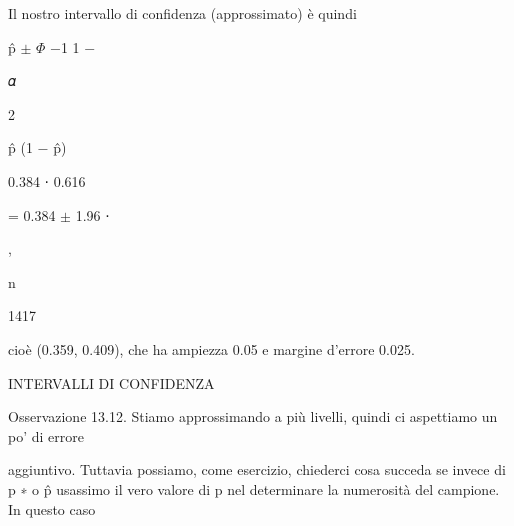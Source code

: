 \documentclass[a4paper,portrait,12pt]{article}
\begin{document}
\begin{flushleft}
Il nostro intervallo di confidenza (approssimato) \`{e} quindi
\end{flushleft}


\begin{flushleft}
p̂ $\pm$ $\Phi$ $-$1 1 $-$
\end{flushleft}





\begin{flushleft}
𝛼
\end{flushleft}


2





\begin{flushleft}
p̂ (1 $-$ p̂)
\end{flushleft}


0.384 ⋅ 0.616


= 0.384 $\pm$ 1.96 ⋅


,


\begin{flushleft}
n
\end{flushleft}


1417





\begin{flushleft}
cio\`{e} (0.359, 0.409), che ha ampiezza 0.05 e margine d'errore 0.025.
\end{flushleft}










\begin{flushleft}
INTERVALLI DI CONFIDENZA
\end{flushleft}





\begin{flushleft}
Osservazione 13.12. Stiamo approssimando a più livelli, quindi ci aspettiamo un po' di errore
\end{flushleft}


\begin{flushleft}
aggiuntivo. Tuttavia possiamo, come esercizio, chiederci cosa succeda se invece di p ∗ o p̂ usassimo il vero valore di p nel determinare la numerosit\`{a} del campione. In questo caso
\end{flushleft}
\end{document}
